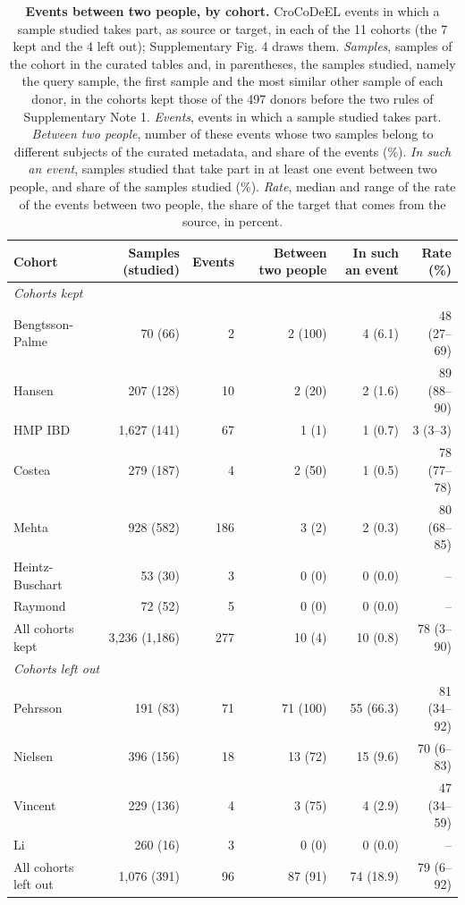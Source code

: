 \documentclass[11pt,a4paper]{article}
\begin{document}
\setcounter{table}{7}
\begin{table}[!htbp]\centering\small
\caption[Events between two people, by cohort]{\textbf{Events between two people, by cohort.} CroCoDeEL events in which a sample studied takes part, as source or target, in each of the 11 cohorts (the 7 kept and the 4 left out); Supplementary Fig. 4 draws them. \textit{Samples}, samples of the cohort in the curated tables and, in parentheses, the samples studied, namely the query sample, the first sample and the most similar other sample of each donor, in the cohorts kept those of the 497 donors before the two rules of Supplementary Note 1. \textit{Events}, events in which a sample studied takes part. \textit{Between two people}, number of these events whose two samples belong to different subjects of the curated metadata, and share of the events (\%). \textit{In such an event}, samples studied that take part in at least one event between two people, and share of the samples studied (\%). \textit{Rate}, median and range of the rate of the events between two people, the share of the target that comes from the source, in percent.}
\setlength{\tabcolsep}{5pt}
\begin{tabular}{lrrrrr}
\toprule
Cohort & Samples (studied) & Events & Between two people & In such an event & Rate (\%) \\
\midrule
\multicolumn{6}{l}{\textit{Cohorts kept}} \\
Bengtsson-Palme & 70 (66) & 2 & 2 (100) & 4 (6.1) & 48 (27--69) \\
Hansen & 207 (128) & 10 & 2 (20) & 2 (1.6) & 89 (88--90) \\
HMP IBD & 1,627 (141) & 67 & 1 (1) & 1 (0.7) & 3 (3--3) \\
Costea & 279 (187) & 4 & 2 (50) & 1 (0.5) & 78 (77--78) \\
Mehta & 928 (582) & 186 & 3 (2) & 2 (0.3) & 80 (68--85) \\
Heintz-Buschart & 53 (30) & 3 & 0 (0) & 0 (0.0) & -- \\
Raymond & 72 (52) & 5 & 0 (0) & 0 (0.0) & -- \\
\midrule
All cohorts kept & 3,236 (1,186) & 277 & 10 (4) & 10 (0.8) & 78 (3--90) \\
\midrule
\multicolumn{6}{l}{\textit{Cohorts left out}} \\
Pehrsson & 191 (83) & 71 & 71 (100) & 55 (66.3) & 81 (34--92) \\
Nielsen & 396 (156) & 18 & 13 (72) & 15 (9.6) & 70 (6--83) \\
Vincent & 229 (136) & 4 & 3 (75) & 4 (2.9) & 47 (34--59) \\
Li & 260 (16) & 3 & 0 (0) & 0 (0.0) & -- \\
\midrule
All cohorts left out & 1,076 (391) & 96 & 87 (91) & 74 (18.9) & 79 (6--92) \\
\bottomrule
\end{tabular}
\end{table}
\end{document}
